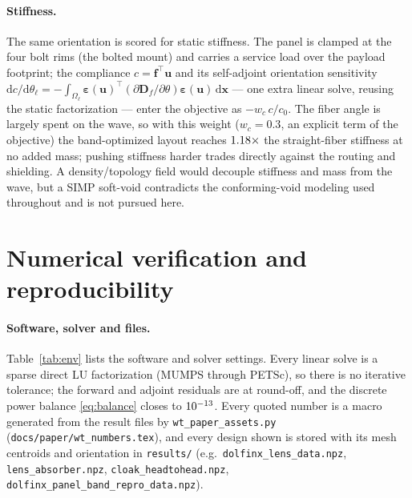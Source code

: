\paragraph{Stiffness.}
The same orientation is scored for static stiffness. The panel is clamped at the four bolt
rims (the bolted mount) and carries a service load over the payload footprint; the
compliance $c=\mathbf f^\top\mathbf u$ and its self-adjoint orientation sensitivity
$\mathrm d c/\mathrm d\theta_\ell=-\int_{\Omega_\ell}
\boldsymbol\varepsilon(\mathbf u)^\top(\partial\mathbf D_f/\partial\theta)
\boldsymbol\varepsilon(\mathbf u)\,\mathrm d\mathbf x$ --- one extra linear solve, reusing
the static factorization --- enter the objective as $-w_c\,c/c_0$. The fiber angle is largely
spent on the wave, so with this weight ($w_c=0.3$, an explicit term of the objective) the
band-optimized layout reaches $1.18\times$ the straight-fiber stiffness at no added
mass; pushing stiffness
harder trades directly against the routing and shielding. A density/topology field would
decouple stiffness and mass from the wave, but a SIMP soft-void contradicts the
conforming-void modeling used throughout and is not pursued here.

\section{Numerical verification and reproducibility}\label{app:verify}
\paragraph{Software, solver and files.} Table~\ref{tab:env} lists the software and solver settings. Every
linear solve is a sparse direct LU factorization (MUMPS through PETSc), so there is no iterative tolerance;
the forward and adjoint residuals are at round-off, and the discrete power balance \eqref{eq:balance} closes to
$10^{-13}$. Every quoted number is a macro generated from the result files by
\texttt{wt\_\allowbreak paper\_\allowbreak assets.py} (\texttt{docs/paper/wt\_numbers.tex}), and every design
shown is stored with its mesh centroids and orientation in \texttt{results/} (e.g.\
\texttt{dolfinx\_lens\_data.npz}, \texttt{lens\_absorber.npz}, \texttt{cloak\_headtohead.npz},
\texttt{dolfinx\_panel\_band\_repro\_data.npz}).

